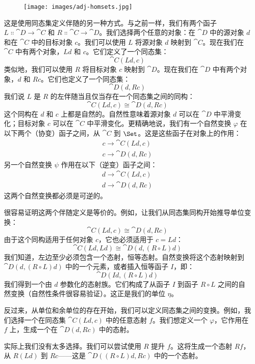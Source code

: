 \begin{figure}[H]
  \centering
  \texttt{[image: images/adj-homsets.jpg]}
\end{figure}

\noindent
这是使用同态集定义伴随的另一种方式。与之前一样，我们有两个函子 $L \Colon \cat{D} \to \cat{C}$ 和 $R \Colon \cat{C} \to \cat{D}$。我们选择两个任意的对象：在 $\cat{D}$ 中的源对象 $d$ 和在 $\cat{C}$ 中的目标对象 $c$。我们可以使用 $L$ 将源对象 $d$ 映射到 $\cat{C}$。现在我们在 $\cat{C}$ 中有两个对象，$L d$ 和 $c$。它们定义了一个同态集：
\[\cat{C}(L d, c)\]
类似地，我们可以使用 $R$ 将目标对象 $c$ 映射到 $\cat{D}$。现在我们在 $\cat{D}$ 中有两个对象，$d$ 和 $R c$。它们也定义了一个同态集：
\[\cat{D}(d, R c)\]
我们说 $L$ 是 $R$ 的左伴随当且仅当存在一个同态集之间的同构：
\[\cat{C}(L d, c) \cong \cat{D}(d, R c)\]
这个同构在 $d$ 和 $c$ 上都是自然的。自然性意味着源对象 $d$ 可以在 $\cat{D}$ 中平滑变化；目标对象 $c$ 可以在 $\cat{C}$ 中平滑变化。更精确地说，我们有一个自然变换 $\varphi$ 在以下两个（协变）函子之间，从 $\cat{C}$ 到 $\Set$。这是这些函子在对象上的作用：
\begin{gather*}
  c \to \cat{C}(L d, c) \\
  c \to \cat{D}(d, R c)
\end{gather*}
另一个自然变换 $\psi$ 作用在以下（逆变）函子之间：
\begin{gather*}
  d \to \cat{C}(L d, c) \\
  d \to \cat{D}(d, R c)
\end{gather*}
这两个自然变换都必须是可逆的。

很容易证明这两个伴随定义是等价的。例如，让我们从同态集同构开始推导单位变换：
\[\cat{C}(L d, c) \cong \cat{D}(d, R c)\]
由于这个同构适用于任何对象 $c$，它也必须适用于 $c = L d$：
\[\cat{C}(L d, L d) \cong \cat{D}(d, (R \circ L) d)\]
我们知道，左边至少必须包含一个态射，恒等态射。自然变换将这个态射映射到 $\cat{D}(d, (R \circ L) d)$ 中的一个元素，或者插入恒等函子 $I$，即：
\[\cat{D}(I d, (R \circ L) d)\]
我们得到一个由 $d$ 参数化的态射族。它们构成了从函子 $I$ 到函子 $R \circ L$ 之间的自然变换（自然性条件很容易验证）。这正是我们的单位 $\eta$。

反过来，从单位和余单位的存在开始，我们可以定义同态集之间的变换。例如，我们选择一个在同态集 $\cat{C}(L d, c)$ 中的任意态射 $f$。我们想定义一个 $\varphi$，它作用在 $f$ 上，生成一个在 $\cat{D}(d, R c)$ 中的态射。

实际上我们没有太多选择。我们可以尝试使用 $R$ 提升 $f$。这将生成一个态射 $R f$，从 $R (L d)$ 到 $R c$——这是 $\cat{D}((R \circ L) d, R c)$ 中的一个态射。

